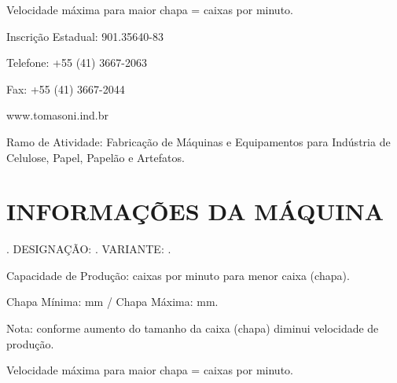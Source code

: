 Velocidade máxima para maior chapa = \productionCapacitymaximumSheet \space caixas por minuto.

\vspace*{\fill}
\vspace*{\fill}
\vspace*{\fill}

Inscrição Estadual: 901.35640-83

Telefone: +55 (41) 3667-2063

Fax: +55 (41) 3667-2044

www.tomasoni.ind.br

Ramo de Atividade: Fabricação de Máquinas e Equipamentos para Indústria de Celulose, Papel, Papelão e Artefatos.

\vspace{40 pt}

\section{\large{INFORMAÇÕES DA MÁQUINA}}


\machineName \space. DESIGNAÇÃO: \machineShortName. VARIANTE: \variant.

Capacidade de Produção: \productionCapacityminimumSheet \space caixas por minuto para menor caixa (chapa).

Chapa Mínima: \minimumSheet mm / Chapa Máxima: \maximumSheet mm.

Nota: conforme aumento do tamanho da caixa (chapa) diminui velocidade de produção.

Velocidade máxima para maior chapa = \productionCapacitymaximumSheet \space caixas por minuto.

\vspace*{\fill}
\vspace*{\fill}
\vspace*{\fill}